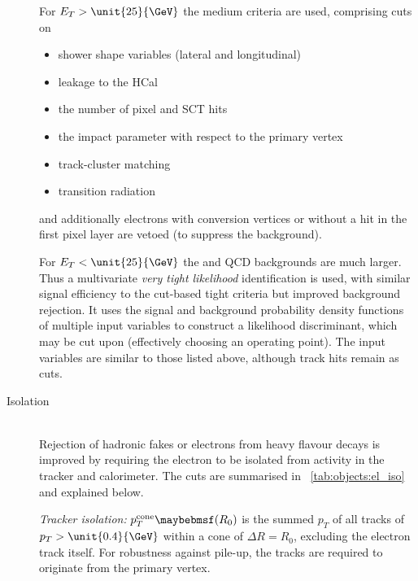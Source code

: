 \begin{description}
	For $E_T > \unit{25}{\GeV}$ the medium criteria are used, comprising cuts on
	\begin{itemize}[noitemsep,nolistsep]
		\item shower shape variables (lateral and longitudinal)
		\item leakage to the \ac{HCal}
		\item the number of pixel and \acs{SCT} hits
		\item the impact parameter with respect to the primary vertex
		\item track-cluster matching
		\item transition radiation
	\end{itemize}
	and additionally electrons with conversion vertices or without a hit in the first 
	pixel layer are vetoed (to suppress the \Wgamma background).
 
 	For $E_T < \unit{25}{\GeV}$ the \Wjets and QCD backgrounds are much larger. Thus a 
 	multivariate \textit{very tight likelihood} identification is used, with similar 
 	signal efficiency to the cut-based tight criteria but improved background rejection. 
 	It uses the signal and background probability density functions of multiple input 
 	variables to construct a likelihood discriminant, which may be cut upon (effectively 
 	choosing an operating point). The input variables are similar to those listed above, 
 	although track hits remain as cuts.
\item[Isolation] \hfill \\
	Rejection of hadronic fakes or electrons from heavy flavour decays is improved by 
	requiring the electron to be isolated from activity in the tracker and calorimeter. 
	The cuts are summarised in \Table~\ref{tab:objects:el_iso} and explained below.

	\textit{Tracker isolation:} $p_T^{\text{cone}}\parenths{R_0}$ is the summed $p_T$ of 
	all tracks of $p_T > \unit{0.4}{\GeV}$ within a cone of $\Delta R = R_0$, excluding 
	the electron track itself. For robustness against pile-up, the tracks are required to 
	originate from the primary vertex.


\end{description}
